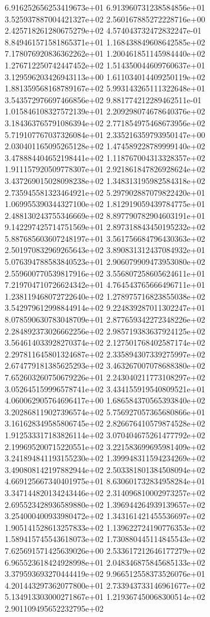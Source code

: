 6.916252656253419673e+01 6.913960731238584856e+01 3.525937887004421327e+02
2.560167885272228716e+00 2.425718261280675279e+02 4.574043732472832247e-01
8.849461571581865371e+01 1.168438849608642585e+02 7.178076920836362262e+01
1.200461851145984440e+02 1.276712250742447452e+02 1.514350044609760637e+01
3.129596203426943113e+00 1.611034014409250119e+02 1.881359568168789167e+02
5.993143265111322648e+01 3.543572976697466856e+02 9.881774212289462511e-01
1.015846108327572139e+01 2.209298074678640376e+02 3.184363765791086394e+02
2.771854975468673956e+02 5.719107767037326084e+01 2.335216359793950147e+00
2.030401165095265128e+02 1.474589228789999140e+02 3.478884404652198441e+02
1.118767004313328357e+02 1.911157920509778307e+01 2.921861847826928624e+02
3.437269015028098238e+02 1.348313195982584318e+02 2.735945581323464921e+02
5.297902887079822420e+01 1.069955390344327100e+02 1.812919059439784775e+01
2.488130243755346669e+02 8.897790782904603191e+01 9.142297425714751569e+01
2.897318843450195232e+02 5.887685603607248197e+01 3.561756684796430363e+02
2.501970832969265643e+02 3.890831312437084932e+01 5.076394788583840523e+01
2.906079909473953080e+02 2.559600770539817916e+02 3.556807258605624611e+01
7.219704710726624342e+01 4.764543765666496711e+01 1.238119468072722640e+02
1.278975716823855038e+02 3.542979612998844914e+02 9.224839287011302247e+01
8.078590630783048709e+01 2.877659342272348226e+02 2.284892373026662256e+02
2.985719383637924125e+02 3.564614033928270374e+02 2.127501768402587174e+02
2.297811645801324687e+02 2.335894307339275997e+02 2.674779181385625293e+02
3.463267007078688380e+02 7.652603260750679226e+01 2.243040211773108297e+02
3.052645159996578741e+02 3.434155919540809521e+01 4.060062905764696417e+00
1.686584370565393840e+02 3.202868119027396574e+02 5.756927057365680866e+01
3.161628349585806745e+02 2.826676410579874528e+02 1.912533317183826114e+02
3.070404675261477792e+02 2.199695200715220551e+02 3.221583699695981409e+02
3.241894841193155230e+02 1.399948311594234269e+02 3.490808142197882944e+02
2.503381801384508094e+02 4.669125667340401975e+01 8.630601732834958284e+01
3.347144820134243446e+02 2.314096810002973257e+02 2.695523428936589880e+02
1.396944264939139657e+02 3.254000400933980472e+02 1.343161421455536697e+02
1.905141528613257833e+02 1.139622724190776353e+02 1.589415745543618073e+02
1.730880445114845543e+02 7.625691571425639026e+00 2.533617212646177279e+02
6.965523618424928998e+01 2.048346875845685133e+02 3.379593693270444419e+02
9.966512558373526076e+01 4.201443297362077800e+01 2.733943733146961677e+02
5.134913303000271867e+01 1.219367450068300514e+02 2.901109495652232795e+02
